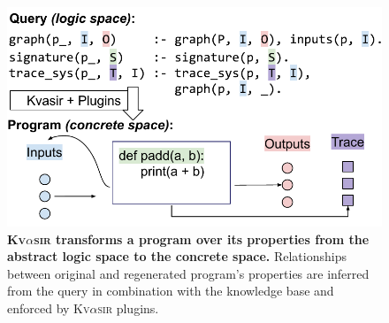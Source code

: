 \documentclass[nonacm,sigplan,review]{acmart}
\def\eg{{\em e.g.}, }
\newcommand{\sys}{{\scshape Kv{$\alpha$}sir}\xspace}
\newcommand{\heading}[1]{\vspace{2pt}\noindent\textbf{\emph{#1}}:\enspace}
\newcommand{\ttt}[1]{\texttt{#1}\xspace}
\begin{document}


\begin{figure}[t]
\centering
  \includegraphics[width=.9\columnwidth]{figs/kvasir_logic-space.pdf}
  \caption{\textbf{\sys transforms a program over its properties from the abstract logic space to the concrete space.}
  Relationships between original and regenerated program's properties are inferred 
  from the query in combination with the knowledge base and enforced by \sys plugins.
  }
  \label{fig:logic-to-concrete}
\end{figure}
\end{document}
